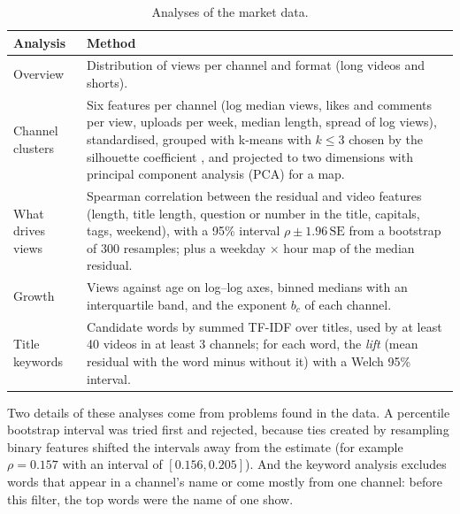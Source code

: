 \begin{table}[H]
\centering
\caption{Analyses of the market data.}
\label{tab:analyses}
\small
\begin{tabular}{@{}p{2.6cm}p{11.6cm}@{}}
\toprule
\textbf{Analysis} & \textbf{Method} \\
\midrule
Overview & Distribution of views per channel and format (long videos and shorts). \\
Channel clusters & Six features per channel (log median views, likes and comments per view, uploads per week, median length, spread of log views), standardised, grouped with k-means \cite{lloyd1982kmeans} with $k \leq 3$ chosen by the silhouette coefficient \cite{rousseeuw1987silhouette}, and projected to two dimensions with principal component analysis (PCA) for a map. \\
What drives views & Spearman correlation \cite{spearman1904} between the residual and video features (length, title length, question or number in the title, capitals, tags, weekend), with a 95\% interval $\rho \pm 1.96\,\mathrm{SE}$ from a bootstrap \cite{efron1979bootstrap} of 300 resamples; plus a weekday $\times$ hour map of the median residual. \\
Growth & Views against age on log--log axes, binned medians with an interquartile band, and the exponent $b_c$ of each channel. \\
Title keywords & Candidate words by summed TF-IDF over titles, used by at least 40 videos in at least 3 channels; for each word, the \textit{lift} (mean residual with the word minus without it) with a Welch \cite{welch1947} 95\% interval. \\
\bottomrule
\end{tabular}
\end{table}

Two details of these analyses come from problems found in the data. A percentile bootstrap interval was tried first and rejected, because ties created by resampling binary features shifted the intervals away from the estimate (for example $\rho = 0.157$ with an interval of $[0.156, 0.205]$). And the keyword analysis excludes words that appear in a channel's name or come mostly from one channel: before this filter, the top words were the name of one show.
